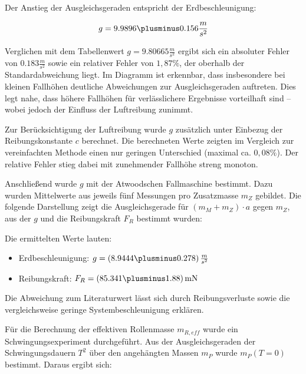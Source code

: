 \documentclass{protokoll}
\begin{document}
Der Anstieg der Ausgleichsgeraden entspricht der Erdbeschleunigung:

\begin{equation}
 g = 9.9896 \plusminus 0.156 \frac{m}{s^2}
\end{equation}

Verglichen mit dem Tabellenwert $g = 9.80665 \frac{m}{s^2}$ ergibt sich ein absoluter Fehler von $0.183 \frac{m}{s^2}$ sowie ein relativer Fehler von $1{,}87\%$, der oberhalb der Standardabweichung liegt. Im Diagramm ist erkennbar, dass insbesondere bei kleinen Fallhöhen deutliche Abweichungen zur Ausgleichsgeraden auftreten. Dies legt nahe, dass höhere Fallhöhen für verlässlichere Ergebnisse vorteilhaft sind – wobei jedoch der Einfluss der Luftreibung zunimmt.

Zur Berücksichtigung der Luftreibung wurde $g$ zusätzlich unter Einbezug der Reibungskonstante $c$ berechnet. Die berechneten Werte zeigten im Vergleich zur vereinfachten Methode einen nur geringen Unterschied (maximal ca. $0{,}08\%$). Der relative Fehler stieg dabei mit zunehmender Fallhöhe streng monoton.

Anschließend wurde $g$ mit der Atwoodschen Fallmaschine bestimmt. Dazu wurden Mittelwerte aus jeweils fünf Messungen pro Zusatzmasse $m_Z$ gebildet. Die folgende Darstellung zeigt die Ausgleichsgerade für $(m_M + m_Z) \cdot a$ gegen $m_Z$, aus der $g$ und die Reibungskraft $F_R$ bestimmt wurden:


Die ermittelten Werte lauten:

\begin{itemize}
  \item Erdbeschleunigung: $g = (8.9444 \plusminus 0.278)\,\frac{m}{s^2}$
  \item Reibungskraft: $F_R = (85.341 \plusminus 1.88)\,\mathrm{mN}$
\end{itemize}

Die Abweichung zum Literaturwert lässt sich durch Reibungsverluste sowie die vergleichsweise geringe Systembeschleunigung erklären.

Für die Berechnung der effektiven Rollenmasse $m_{R,eff}$ wurde ein Schwingungsexperiment durchgeführt. Aus der Ausgleichsgeraden der Schwingungsdauern $T^2$ über den angehängten Massen $m_P$ wurde $m_P(T=0)$ bestimmt. Daraus ergibt sich:
\end{document}

